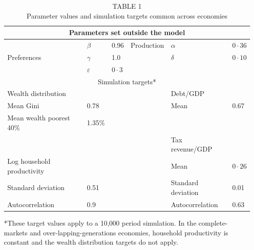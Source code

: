 \documentclass[11pt]{article}
\begin{document}
\begin{table}[h]
\begin{center}
\captionsetup{labelformat=empty}
\caption{TABLE 1\\
Parameter values and simulation targets common across economies}
\begin{tabular}{|l|l|l|l|l|l|}
\hline
\multicolumn{6}{|c|}{Parameters set outside the model} \\
\hline
\multirow[t]{3}{*}{Preferences} & $\beta$ & 0.96 & Production & $\alpha$ & $0 \cdot 36$ \\
\hline
 & $\gamma$ & 1.0 &  & $\delta$ & $0 \cdot 10$ \\
\hline
 & $\varepsilon$ & $0 \cdot 3$ &  &  &  \\
\hline
\multicolumn{6}{|c|}{Simulation targets*} \\
\hline
Wealth distribution &  &  &  & Debt/GDP &  \\
\hline
Mean Gini & 0.78 &  &  & Mean & 0.67 \\
\hline
Mean wealth poorest 40\% & 1.35\% &  &  &  &  \\
\hline
 &  &  &  & Tax revenue/GDP &  \\
\hline
Log household productivity &  &  &  & Mean & $0 \cdot 26$ \\
\hline
Standard deviation & 0.51 &  &  & Standard deviation & 0.01 \\
\hline
Autocorrelation & 0.9 &  &  & Autocorrelation & 0.63 \\
\hline
\end{tabular}
\end{center}
\end{table}

*These target values apply to a 10,000 period simulation. In the complete-markets and over-lapping-generations economies, household productivity is constant and the wealth distribution targets do not apply.
\end{document}
